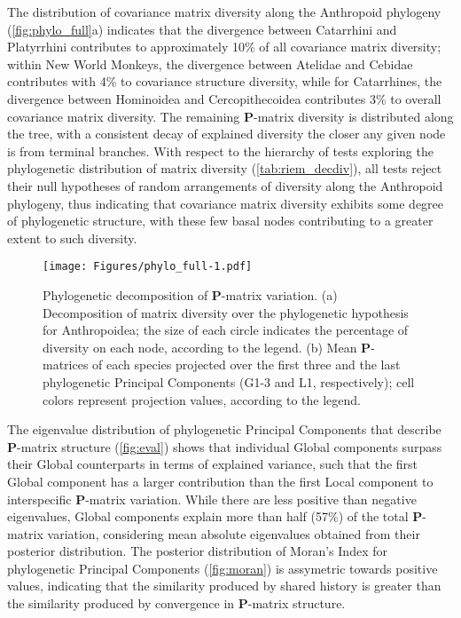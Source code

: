 \documentclass[12pt,twoside]{report}
\begin{document}
The distribution of covariance matrix diversity along the Anthropoid
phylogeny (\autoref{fig:phylo_full}a) indicates that the divergence
between Catarrhini and Platyrrhini contributes to approximately 10\% of
all covariance matrix diversity; within New World Monkeys, the
divergence between Atelidae and Cebidae contributes with 4\% to
covariance structure diversity, while for Catarrhines, the divergence
between Hominoidea and Cercopithecoidea contributes 3\% to overall
covariance matrix diversity. The remaining $\mathbf{P}$-matrix diversity
is distributed along the tree, with a consistent decay of explained
diversity the closer any given node is from terminal branches. With
respect to the hierarchy of tests exploring the phylogenetic
distribution of matrix diversity (\autoref{tab:riem_decdiv}), all tests
reject their null hypotheses of random arrangements of diversity along
the Anthropoid phylogeny, thus indicating that covariance matrix
diversity exhibits some degree of phylogenetic structure, with these few
basal nodes contributing to a greater extent to such diversity.



\begin{figure}[htbp]
\centering
\texttt{[image: Figures/phylo\_full-1.pdf]}
\caption{Phylogenetic decomposition of $\mathbf{P}$-matrix variation.
(a) Decomposition of matrix diversity over the phylogenetic hypothesis
for Anthropoidea; the size of each circle indicates the percentage of
diversity on each node, according to the legend. (b) Mean
$\mathbf{P}$-matrices of each species projected over the first three and
the last phylogenetic Principal Components (G1-3 and L1, respectively);
cell colors represent projection values, according to the legend.
\label{fig:phylo_full}}
\end{figure}

The eigenvalue distribution of phylogenetic Principal Components that
describe $\mathbf{P}$-matrix structure (\autoref{fig:eval}) shows that
individual Global components surpass their Global counterparts in terms
of explained variance, such that the first Global component has a larger
contribution than the first Local component to interspecific
$\mathbf{P}$-matrix variation. While there are less positive than
negative eigenvalues, Global components explain more than half (57\%) of
the total $\mathbf{P}$-matrix variation, considering mean absolute
eigenvalues obtained from their posterior distribution. The posterior
distribution of Moran's Index for phylogenetic Principal Components
(\autoref{fig:moran}) is assymetric towards positive values, indicating
that the similarity produced by shared history is greater than the
similarity produced by convergence in $\mathbf{P}$-matrix structure.
\end{document}
